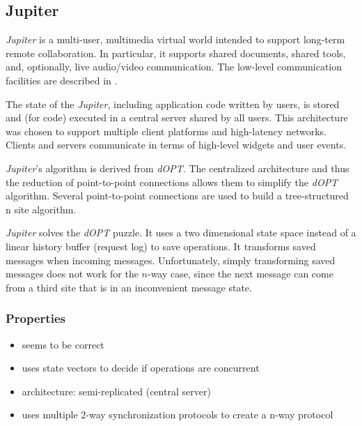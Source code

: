 \subsection{Jupiter}
\label{algo:jupiter}

\emph{Jupiter} is a multi-user, multimedia virtual world intended to support long-term remote collaboration. In particular, it supports shared documents, shared tools, and, optionally, live audio/video communication. The low-level communication facilities are described in \cite{jupiter95}.

The state of the \emph{Jupiter}, including application code written by users, is stored and (for code) executed in a central server shared by all users. This architecture was chosen to support multiple client platforms and high-latency networks. Clients and servers communicate in terms of high-level widgets and user events.

\emph{Jupiter}'s algorithm is derived from \emph{dOPT}. The centralized architecture and thus the reduction of point-to-point connections allows them to simplify the \emph{dOPT} algorithm. Several point-to-point connections are used to build a tree-structured n site algorithm.

\emph{Jupiter} solves the \emph{dOPT} puzzle. It uses a two dimensional state space instead of a linear history buffer (request log) to save operations. It transforms saved messages when incoming messages. Unfortunately, simply transforming saved messages does not work for the $n$-way case, since the next message can come from a third site that is in an inconvenient message state.


\subsubsection{Properties}
\begin{itemize}
 \item seems to be correct
 \item uses state vectors to decide if operations are concurrent
 \item architecture: semi-replicated (central server)
 \item uses multiple 2-way synchronization protocols to create a n-way protocol
\end{itemize}
